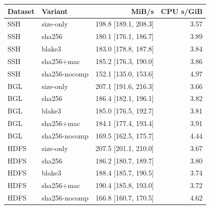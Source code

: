 
\begin{tabular}{@{}llrr@{}}
\toprule
Dataset & Variant & MiB/s & CPU s/GiB \\
\midrule
SSH & size-only & 198.8 [189.1, 208.3] & 3.57 \\
SSH & sha256 & 180.1 [176.1, 186.7] & 3.89 \\
SSH & blake3 & 183.0 [178.8, 187.8] & 3.84 \\
SSH & sha256+mac & 185.2 [176.3, 190.0] & 3.86 \\
SSH & sha256-nocomp & 152.1 [135.0, 153.6] & 4.97 \\
\addlinespace
BGL & size-only & 207.1 [191.6, 216.3] & 3.66 \\
BGL & sha256 & 186.4 [182.1, 196.1] & 3.82 \\
BGL & blake3 & 185.0 [176.5, 192.7] & 3.81 \\
BGL & sha256+mac & 184.1 [177.4, 193.4] & 3.91 \\
BGL & sha256-nocomp & 169.5 [162.5, 175.7] & 4.44 \\
\addlinespace
HDFS & size-only & 207.5 [201.1, 210.0] & 3.67 \\
HDFS & sha256 & 186.2 [180.7, 189.7] & 3.80 \\
HDFS & blake3 & 188.4 [185.7, 190.5] & 3.74 \\
HDFS & sha256+mac & 190.4 [185.8, 193.0] & 3.72 \\
HDFS & sha256-nocomp & 166.8 [160.7, 170.5] & 4.62 \\
\bottomrule
\end{tabular}
